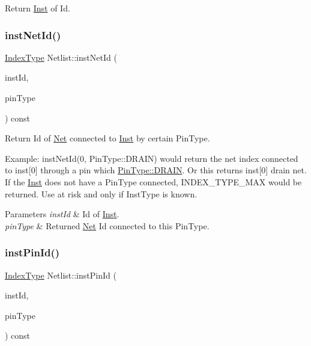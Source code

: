 Return \hyperlink{classInst}{Inst} of Id. 

\mbox{\label{classNetlist_af7ac6daa5f0f66a60c71b69a1d8fd670}} 
\subsubsection{\texorpdfstring{inst\+Net\+Id()}{instNetId()}}
{\footnotesize\ttfamily \hyperlink{type_8h_a581e8093e28e7362f2b6937296190676}{Index\+Type} Netlist\+::inst\+Net\+Id (\begin{DoxyParamCaption}\item[{\hyperlink{type_8h_a581e8093e28e7362f2b6937296190676}{Index\+Type}}]{inst\+Id,  }\item[{\hyperlink{type_8h_afaab50027002ecbb6c8ac27e727d1bb4}{Pin\+Type}}]{pin\+Type }\end{DoxyParamCaption}) const}



Return Id of \hyperlink{classNet}{Net} connected to \hyperlink{classInst}{Inst} by certain Pin\+Type. 

Example\+: inst\+Net\+Id(0, Pin\+Type\+::\+D\+R\+A\+I\+N) would return the net index connected to inst\mbox{[}0\mbox{]} through a pin which \hyperlink{type_8h_afaab50027002ecbb6c8ac27e727d1bb4ad22e8f7ce637479aeffe9dab9ee7337d}{Pin\+Type\+::\+D\+R\+A\+IN}. Or this returns inst\mbox{[}0\mbox{]} drain net. If the \hyperlink{classInst}{Inst} does not have a Pin\+Type connected, I\+N\+D\+E\+X\+\_\+\+T\+Y\+P\+E\+\_\+\+M\+AX would be returned. Use at risk and only if Inst\+Type is known.


\begin{DoxyParams}{Parameters}
{\em inst\+Id} & Id of \hyperlink{classInst}{Inst}. \\
\hline
{\em pin\+Type} & Returned \hyperlink{classNet}{Net} Id connected to this Pin\+Type. \\
\hline
\end{DoxyParams}
\mbox{\label{classNetlist_a981030068cfb1eb1ce360ee6c943513a}} 
\subsubsection{\texorpdfstring{inst\+Pin\+Id()}{instPinId()}}
{\footnotesize\ttfamily \hyperlink{type_8h_a581e8093e28e7362f2b6937296190676}{Index\+Type} Netlist\+::inst\+Pin\+Id (\begin{DoxyParamCaption}\item[{\hyperlink{type_8h_a581e8093e28e7362f2b6937296190676}{Index\+Type}}]{inst\+Id,  }\item[{\hyperlink{type_8h_afaab50027002ecbb6c8ac27e727d1bb4}{Pin\+Type}}]{pin\+Type }\end{DoxyParamCaption}) const}



